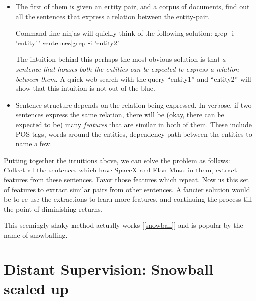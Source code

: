 \documentclass[a4paper,10pt]{article}
\begin{document}
\begin{itemize}
 
\item The first of them is given an entity pair, and a corpus of documents, find out all the sentences that
express a relation between the entity-pair.

Command line ninjas will quickly think of the following solution:
grep -i 'entity1' sentences|grep -i 'entity2'

The intuition behind this perhaps the most obvious solution is that \emph{a sentence
that houses both the entities can be expected to express a relation between them}.
A quick web search with the query ``entity1'' and ``entity2'' will show that this 
intuition is not out of the blue.

\item Sentence structure depends on the relation being expressed.
In verbose, if two sentences express the same relation, there will be (okay, there can be expected to be)
many \emph{features} that are similar in both of them. These include POS tags, words around the entities,
dependency path between the entities to name a few.

\end{itemize}
Putting together the intuitions above, we can solve the problem as follows:
Collect all the sentences which have SpaceX and Elon Musk in them, extract features 
from these sentences. Favor those features which repeat.
Now us this set of features to extract similar pairs from other sentences.
A fancier solution would be to re use the extractions to learn more features, and continuing the process 
till the point of diminishing returns.

This seemingly shaky method actually works [\ref{snowball}] and is popular by the name of snowballing.

\section{Distant Supervision: Snowball scaled up}
\label{ds}
\end{document}
